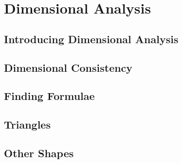 \documentclass[../maths.tex]{subfiles}
\begin{document}
\chapter{Dimensional Analysis}
\section{Introducing Dimensional Analysis}
\section{Dimensional Consistency}
\section{Finding Formulae}
\section{Triangles}
\section{Other Shapes}
\end{document}
